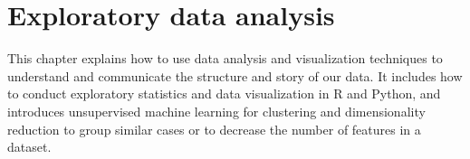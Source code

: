 \chapter{Exploratory data analysis}
\label{chap:eda}

This chapter explains how to use data analysis and visualization techniques to understand and communicate the structure and story of our data.  It includes how to conduct exploratory statistics and data visualization in R and Python, and introduces unsupervised machine learning for clustering and dimensionality reduction to group similar cases or to decrease the number of features in a dataset.







